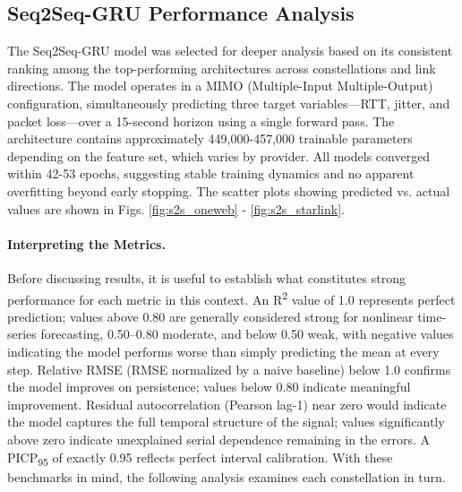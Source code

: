 \documentclass[12pt]{article}
\begin{document}
\subsection{Seq2Seq-GRU Performance Analysis}

The Seq2Seq-GRU model was selected for deeper analysis based on its consistent ranking among the top-performing architectures across constellations and link directions. The model operates in a MIMO (Multiple-Input Multiple-Output) configuration, simultaneously predicting three target variables—RTT, jitter, and packet loss—over a 15-second horizon using a single forward pass. The architecture contains approximately 449{,}000-457{,}000 trainable parameters depending on the feature set, which varies by provider. All models converged within 42-53 epochs, suggesting stable training dynamics and no apparent overfitting beyond early stopping. The scatter plots showing predicted vs. actual values are shown in Figs. \ref{fig:s2s_oneweb} - \ref{fig:s2s_starlink}.

\paragraph{Interpreting the Metrics.}
Before discussing results, it is useful to establish what constitutes strong performance for each metric in this context. An R\textsuperscript{2} value of 1.0 represents perfect prediction; values above 0.80 are generally considered strong for nonlinear time-series forecasting, 0.50--0.80 moderate, and below 0.50 weak, with negative values indicating the model performs worse than simply predicting the mean at every step. Relative RMSE (RMSE normalized by a naive baseline) below 1.0 confirms the model improves on persistence; values below 0.80 indicate meaningful improvement. Residual autocorrelation (Pearson lag-1) near zero would indicate the model captures the full temporal structure of the signal; values significantly above zero indicate unexplained serial dependence remaining in the errors. A PICP\textsubscript{95} of exactly 0.95 reflects perfect interval calibration. With these benchmarks in mind, the following analysis examines each constellation in turn.
\end{document}
